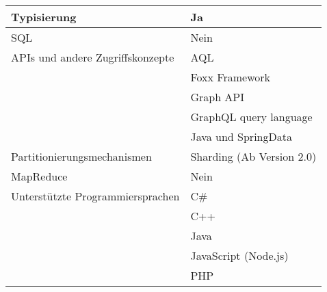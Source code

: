 \begin{table}[h]
\begin{tabular}{|l|l|}
Typisierung                      & Ja                                    \\ \hline
SQL                              & Nein                                  \\ \hline
APIs und andere Zugriffskonzepte & AQL                                   \\
                                 & Foxx Framework                        \\
                                 & Graph API                             \\
                                 & GraphQL query language                \\
                                 & Java und SpringData                   \\ \hline
Partitionierungsmechanismen      & Sharding (Ab Version 2.0)             \\ \hline
MapReduce                        & Nein                                  \\ \hline
Unterstützte Programmiersprachen & C\#                                   \\
                                 & C++                                    \\
                                 & Java                                  \\
                                 & JavaScript (Node.js)                  \\
                                 & PHP                                   \\ \hline                 
    \end{tabular}
\end{table}
